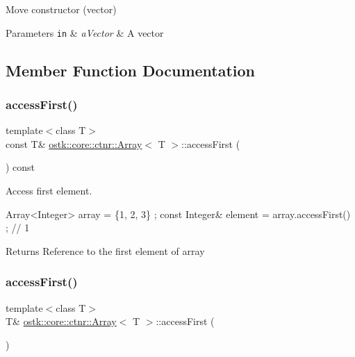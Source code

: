 Move constructor (vector) 


\begin{DoxyParams}[1]{Parameters}
\mbox{\tt in}  & {\em a\+Vector} & A vector \\
\hline
\end{DoxyParams}


\subsection{Member Function Documentation}
\mbox{\label{classostk_1_1core_1_1ctnr_1_1_array_ab8a576023f31f018a134831de36d5eb9}} 
\subsubsection{\texorpdfstring{access\+First()}{accessFirst()}\hspace{0.1cm}{\footnotesize\ttfamily [1/2]}}
{\footnotesize\ttfamily template$<$class T$>$ \\
const T\& \hyperlink{classostk_1_1core_1_1ctnr_1_1_array}{ostk\+::core\+::ctnr\+::\+Array}$<$ T $>$\+::access\+First (\begin{DoxyParamCaption}{ }\end{DoxyParamCaption}) const}



Access first element. 


\begin{DoxyCode}
Array<Integer> array = \{1, 2, 3\} ;
\textcolor{keyword}{const} Integer& element = array.accessFirst() ; \textcolor{comment}{// 1}
\end{DoxyCode}


\begin{DoxyReturn}{Returns}
Reference to the first element of array 
\end{DoxyReturn}
\mbox{\label{classostk_1_1core_1_1ctnr_1_1_array_a88b92f1b1cd74fe742449a0aaa51f2fb}} 
\subsubsection{\texorpdfstring{access\+First()}{accessFirst()}\hspace{0.1cm}{\footnotesize\ttfamily [2/2]}}
{\footnotesize\ttfamily template$<$class T$>$ \\
T\& \hyperlink{classostk_1_1core_1_1ctnr_1_1_array}{ostk\+::core\+::ctnr\+::\+Array}$<$ T $>$\+::access\+First (\begin{DoxyParamCaption}{ }\end{DoxyParamCaption})}



